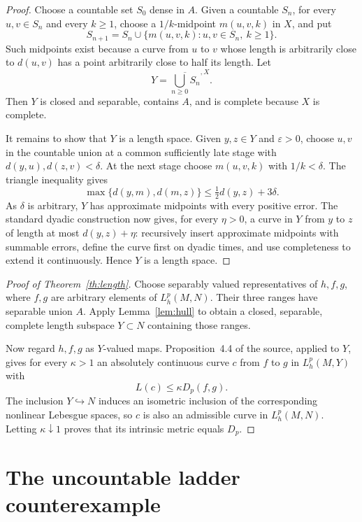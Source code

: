 \documentclass[11pt]{article}
\newcommand{\Dp}{D_p}
\begin{document}
\begin{proof}
Choose a countable set $S_0$ dense in $A$.  Given a countable $S_n$, for
every $u,v\in S_n$ and every $k\geq1$, choose a $1/k$-midpoint
$m(u,v,k)$ in $X$, and put
\[
 S_{n+1}=S_n\cup\{m(u,v,k):u,v\in S_n,\ k\geq1\}.
\]
Such midpoints exist because a curve from $u$ to $v$ whose length is
arbitrarily close to $d(u,v)$ has a point arbitrarily close to half its
length.  Let
\[
 Y=\overline{\bigcup_{n\geq0}S_n}^{,X}.
\]
Then $Y$ is closed and separable, contains $A$, and is complete because $X$
is complete.

It remains to show that $Y$ is a length space.  Given $y,z\in Y$ and
$\varepsilon>0$, choose $u,v$ in the countable union at a common sufficiently
late stage with $d(y,u),d(z,v)<\delta$.  At the next stage choose
$m(u,v,k)$ with $1/k<\delta$.  The triangle inequality gives
\[
 \max\{d(y,m),d(m,z)\}
 \leq \tfrac12d(y,z)+3\delta.
\]
As $\delta$ is arbitrary, $Y$ has approximate midpoints with every positive
error.  The standard dyadic construction now gives, for every $\eta>0$, a
curve in $Y$ from $y$ to $z$ of length at most $d(y,z)+\eta$: recursively
insert approximate midpoints with summable errors, define the curve first on
dyadic times, and use completeness to extend it continuously.  Hence $Y$ is
a length space.
\end{proof}

\begin{proof}[Proof of Theorem~\ref{th:length}]
Choose separably valued representatives of $h,f,g$, where $f,g$ are arbitrary
elements of $L^p_h(M,N)$.  Their three ranges have separable union $A$.
Apply Lemma~\ref{lem:hull} to obtain a closed, separable, complete length
subspace $Y\subset N$ containing those ranges.

Now regard $h,f,g$ as $Y$-valued maps.  Proposition~4.4 of the source, applied
to $Y$, gives for every $\kappa>1$ an absolutely continuous curve $c$ from
$f$ to $g$ in $L^p_h(M,Y)$ with
\[
 L(c)\leq \kappa\Dp(f,g).
\]
The inclusion $Y\hookrightarrow N$ induces an isometric inclusion of the
corresponding nonlinear Lebesgue spaces, so $c$ is also an admissible curve in
$L^p_h(M,N)$.  Letting $\kappa\downarrow1$ proves that its intrinsic metric
equals $\Dp$.
\end{proof}

\section{The uncountable ladder counterexample}
\end{document}
